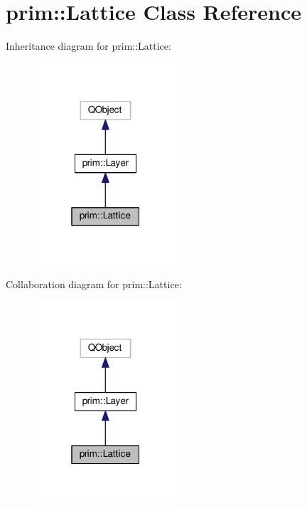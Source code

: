\hypertarget{classprim_1_1Lattice}{}\section{prim\+:\+:Lattice Class Reference}
\label{classprim_1_1Lattice}


Inheritance diagram for prim\+:\+:Lattice\+:\nopagebreak
\begin{figure}[H]
\begin{center}
\leavevmode
\includegraphics[width=151pt]{classprim_1_1Lattice__inherit__graph}
\end{center}
\end{figure}


Collaboration diagram for prim\+:\+:Lattice\+:\nopagebreak
\begin{figure}[H]
\begin{center}
\leavevmode
\includegraphics[width=151pt]{classprim_1_1Lattice__coll__graph}
\end{center}
\end{figure}
